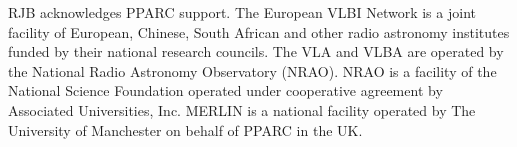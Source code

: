 \documentclass{evn2004}
\begin{document}
%
%
   
%


\begin{acknowledgements}
RJB acknowledges PPARC support. The European VLBI Network is a joint facility of European, Chinese, 
South African and other radio astronomy institutes funded by their 
national research councils. The VLA and VLBA are operated by the
National Radio Astronomy Observatory (NRAO). NRAO is a facility of the
National Science Foundation operated under cooperative agreement by
Associated Universities, Inc. MERLIN is a national facility operated
by The University of Manchester on behalf of PPARC in the UK.

\end{acknowledgements}
\end{document}
